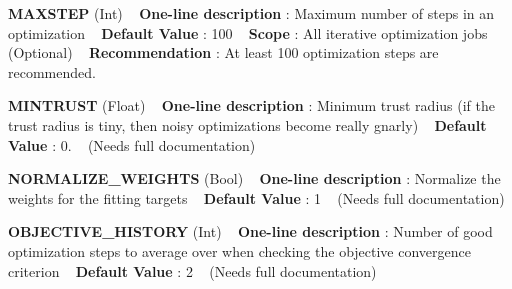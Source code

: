 \begin{DoxyItemize}
\item {\bfseries  M\+A\+X\+S\+T\+EP } (Int) ~\newline
{\bfseries  One-\/line description }\+: Maximum number of steps in an optimization ~\newline
{\bfseries  Default Value }\+: 100 ~\newline
{\bfseries  Scope }\+: All iterative optimization jobs (Optional) ~\newline
{\bfseries  Recommendation }\+: At least 100 optimization steps are recommended.\end{DoxyItemize}
\begin{DoxyItemize}
\item {\bfseries  M\+I\+N\+T\+R\+U\+ST } (Float) ~\newline
{\bfseries  One-\/line description }\+: Minimum trust radius (if the trust radius is tiny, then noisy optimizations become really gnarly) ~\newline
{\bfseries  Default Value }\+: 0. ~\newline
(Needs full documentation)\end{DoxyItemize}
\begin{DoxyItemize}
\item {\bfseries  N\+O\+R\+M\+A\+L\+I\+Z\+E\+\_\+\+W\+E\+I\+G\+H\+TS } (Bool) ~\newline
{\bfseries  One-\/line description }\+: Normalize the weights for the fitting targets ~\newline
{\bfseries  Default Value }\+: 1 ~\newline
(Needs full documentation)\end{DoxyItemize}
\begin{DoxyItemize}
\item {\bfseries  O\+B\+J\+E\+C\+T\+I\+V\+E\+\_\+\+H\+I\+S\+T\+O\+RY } (Int) ~\newline
{\bfseries  One-\/line description }\+: Number of good optimization steps to average over when checking the objective convergence criterion ~\newline
{\bfseries  Default Value }\+: 2 ~\newline
(Needs full documentation)\end{DoxyItemize}
